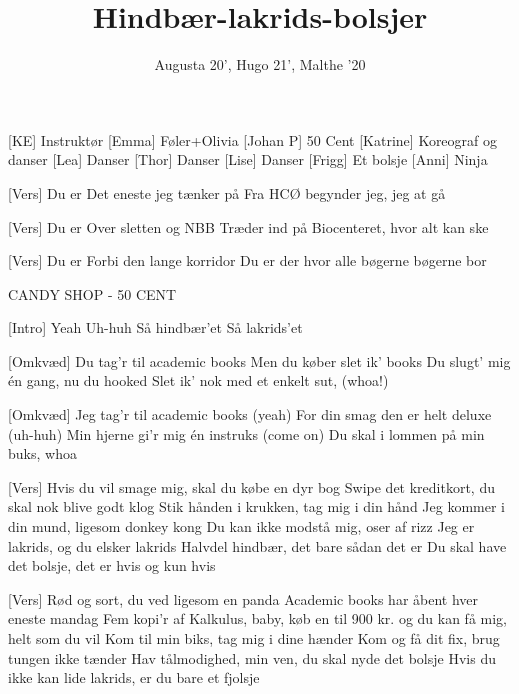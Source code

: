 \documentclass[a4paper, 11pt]{article}
\title{Hindbær-lakrids-bolsjer}
\author{Augusta 20', Hugo 21', Malthe '20}
\begin{document}
\maketitle

\begin{roles}  
[KE] Instruktør
[Emma] Føler+Olivia
[Johan P] 50 Cent
[Katrine] Koreograf og danser
[Lea] Danser
[Thor] Danser
[Lise] Danser
[Frigg] Et bolsje
[Anni] Ninja
\end{roles}

\begin{song}

[Vers] Du er 
Det eneste jeg tænker på 
Fra HCØ begynder jeg, jeg at gå

[Vers] Du er 
Over sletten og NBB
Træder ind på Biocenteret, hvor alt kan ske

[Vers] Du er 
Forbi den lange korridor 
Du er der hvor alle bøgerne
bøgerne bor



CANDY SHOP - 50 CENT 

[Intro] Yeah
Uh-huh
Så hindbær'et 
Så lakrids'et

[Omkvæd] Du tag’r til academic books
Men du køber slet ik' books 
Du slugt’ mig én gang, nu du hooked
Slet ik’ nok med et enkelt sut, (whoa!)

[Omkvæd] Jeg tag’r til academic books (yeah)
For din smag den er helt deluxe (uh-huh)
Min hjerne gi’r mig én instruks (come on)
Du skal i lommen på min buks, whoa



[Vers] Hvis du vil smage mig, skal du købe en dyr bog
Swipe det kreditkort, du skal nok blive godt klog
Stik hånden i krukken, tag mig i din hånd
Jeg kommer i din mund, ligesom donkey kong
Du kan ikke modstå mig, oser af rizz
Jeg er lakrids, og du elsker lakrids
Halvdel hindbær, det bare sådan det er
Du skal have det bolsje, det er hvis og kun hvis

[Vers] Rød og sort, du ved ligesom en panda
Academic books har åbent hver eneste mandag
Fem kopi'r af Kalkulus, baby, køb en til
900 kr. og du kan få mig, helt som du vil 
Kom til min biks, tag mig i dine hænder
Kom og få dit fix, brug tungen ikke tænder 
Hav tålmodighed, min ven, du skal nyde det bolsje
Hvis du ikke kan lide lakrids, er du bare et fjolsje


\end{song}
\end{document}
